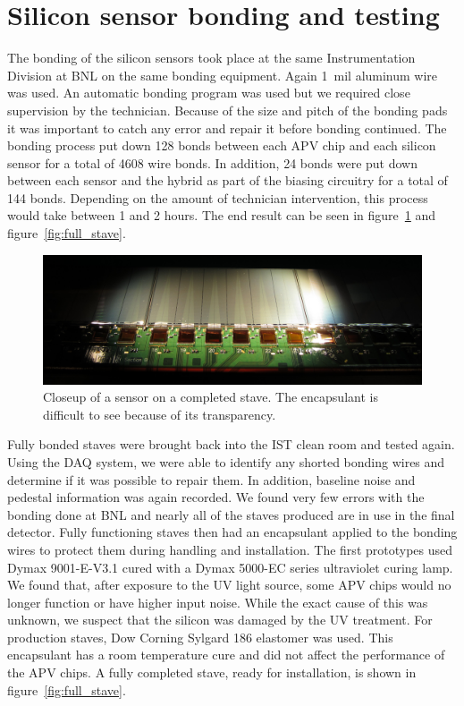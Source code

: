 \documentclass[preprint,12pt]{elsarticle}
\begin{document}
\section{Silicon sensor bonding and testing}
The bonding of the silicon sensors took place at the same Instrumentation
Division at BNL on the same bonding equipment. Again 1~mil aluminum wire was
used. An automatic bonding program was used but we required close supervision by
the technician. Because of the size and pitch of the bonding pads it was
important to catch any error and repair it before bonding continued. The
bonding process put down 128 bonds between each APV chip and each silicon sensor
for a total of 4608 wire bonds. In addition, 24 bonds were put down between
each sensor and the hybrid as part of the biasing circuitry for a total of 144
bonds. Depending on the amount of technician intervention, this process would
take between 1 and 2 hours.  The end result can be seen in figure~\ref{fig:si_bonded}
and figure~\ref{fig:full_stave}.

\begin{figure}[h]
\begin{center}
\includegraphics[width=6.5in, keepaspectratio=true, angle=0]{graphics/si_bonded.jpg}
\caption{Closeup of a sensor on a completed stave.  The encapsulant is difficult
to see because of its transparency.
\label{fig:si_bonded}}
\end{center}
\end{figure}
%
Fully bonded staves were brought back into the IST clean room and tested
again. Using the DAQ system, we were able to identify any shorted bonding wires
and determine if it was possible to repair them. In addition, baseline noise
and pedestal information was again recorded. We found very few errors with the
bonding done at BNL and nearly all of the staves produced are in use in the
final detector. Fully functioning staves then had an encapsulant applied to the
bonding wires to protect them during handling and installation. The first
prototypes used Dymax 9001-E-V3.1 cured with a Dymax 5000-EC series ultraviolet
curing lamp. We found that, after exposure to the UV light source, some APV chips
would no longer function or have higher input noise. While the exact cause of
this was unknown, we suspect that the silicon was damaged by the UV treatment.
For production staves, Dow Corning Sylgard 186 elastomer was used. This
encapsulant has a room temperature cure and did not affect the performance of
the APV chips.  A fully completed stave, ready for installation, is shown in
figure~\ref{fig:full_stave}.
\end{document}
